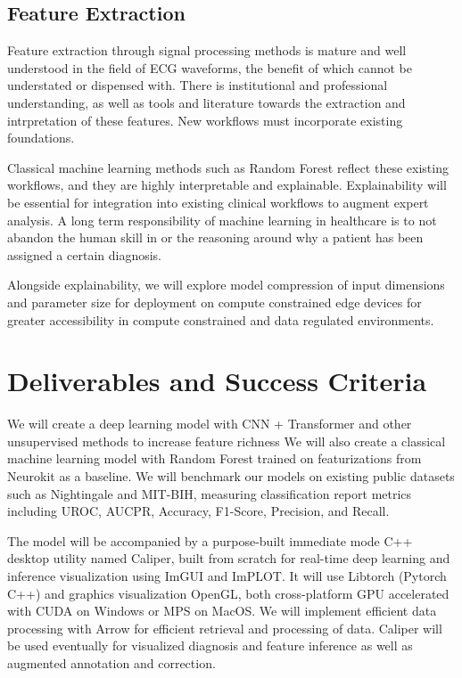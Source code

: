 \documentclass[sigconf,nonacm]{acmart}
\begin{document}
\subsection{Feature Extraction}

Feature extraction through signal processing methods is mature and well understood in the field of ECG waveforms, the benefit of which cannot be understated or dispensed with. There is institutional and professional understanding, as well as tools and literature towards the extraction and intrpretation of these features. New workflows must incorporate existing foundations.

Classical machine learning methods such as Random Forest reflect these existing workflows, and they are highly interpretable and explainable. Explainability will be essential for integration into existing clinical workflows to augment expert analysis. A long term responsibility of machine learning in healthcare is to not abandon the human skill in or the reasoning around why a patient has been assigned a certain diagnosis.

Alongside explainability, we will explore model compression of input dimensions and parameter size for deployment on compute constrained edge devices for greater accessibility in compute constrained and data regulated environments.


  \section{Deliverables and Success Criteria}

We will create a deep learning model with CNN + Transformer and other unsupervised methods to increase feature richness We will also create a classical machine learning model with Random Forest trained on featurizations from Neurokit as a baseline. We will benchmark our models on existing public datasets such as Nightingale and MIT-BIH, measuring classification report metrics including UROC, AUCPR, Accuracy, F1-Score, Precision, and Recall.

The model will be accompanied by a purpose-built immediate mode C++ desktop utility named Caliper, built from scratch for real-time deep learning and inference visualization using ImGUI and ImPLOT. It will use Libtorch (Pytorch C++) and graphics visualization OpenGL, both cross-platform GPU accelerated with CUDA on Windows or MPS on MacOS. We will implement efficient data processing with Arrow for efficient retrieval and processing of data. Caliper will be used eventually for visualized diagnosis and feature inference as well as augmented annotation and correction.
\end{document}
